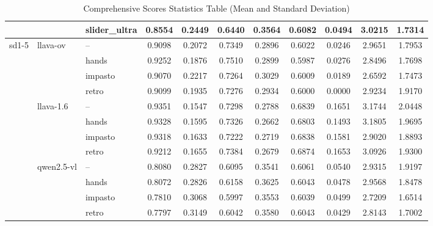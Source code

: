 \begin{table}[p]
{\begin{tabular}{|l|l|l|c|c|c|c|c|c|c|c|}
\cline{3-11}
 &  & slider\_ultra & 0.8554 & 0.2449 & 0.6440 & 0.3564 & 0.6082 & 0.0494 & 3.0215 & 1.7314 \\
\hline
\multirow{12}{*}{sd1-5} & \multirow{4}{*}{llava-ov} & -- & 0.9098 & 0.2072 & 0.7349 & 0.2896 & 0.6022 & 0.0246 & 2.9651 & 1.7953 \\
\cline{3-11}
 &  & hands & 0.9252 & 0.1876 & 0.7510 & 0.2899 & 0.5987 & 0.0276 & 2.8496 & 1.7698 \\
\cline{3-11}
 &  & impasto & 0.9070 & 0.2217 & 0.7264 & 0.3029 & 0.6009 & 0.0189 & 2.6592 & 1.7473 \\
\cline{3-11}
 &  & retro & 0.9099 & 0.1935 & 0.7276 & 0.2934 & 0.6000 & 0.0000 & 2.9234 & 1.9170 \\
\cline{2-11}
 & \multirow{4}{*}{llava-1.6} & -- & 0.9351 & 0.1547 & 0.7298 & 0.2788 & 0.6839 & 0.1651 & 3.1744 & 2.0448 \\
\cline{3-11}
 &  & hands & 0.9328 & 0.1595 & 0.7326 & 0.2662 & 0.6803 & 0.1493 & 3.1805 & 1.9695 \\
\cline{3-11}
 &  & impasto & 0.9318 & 0.1633 & 0.7222 & 0.2719 & 0.6838 & 0.1581 & 2.9020 & 1.8893 \\
\cline{3-11}
 &  & retro & 0.9212 & 0.1655 & 0.7384 & 0.2679 & 0.6874 & 0.1653 & 3.0926 & 1.9300 \\
\cline{2-11}
 & \multirow{4}{*}{qwen2.5-vl} & -- & 0.8080 & 0.2827 & 0.6095 & 0.3541 & 0.6061 & 0.0540 & 2.9315 & 1.9197 \\
\cline{3-11}
 &  & hands & 0.8072 & 0.2826 & 0.6158 & 0.3625 & 0.6043 & 0.0478 & 2.9568 & 1.8478 \\
\cline{3-11}
 &  & impasto & 0.7810 & 0.3068 & 0.5997 & 0.3553 & 0.6039 & 0.0499 & 2.7209 & 1.6514 \\
\cline{3-11}
 &  & retro & 0.7797 & 0.3149 & 0.6042 & 0.3580 & 0.6043 & 0.0429 & 2.8143 & 1.7002 \\
\hline
\end{tabular}
} %
\caption{Comprehensive Scores Statistics Table (Mean and Standard Deviation)}
\label{tab:scores_statistics}
\end{table}

\restoregeometry